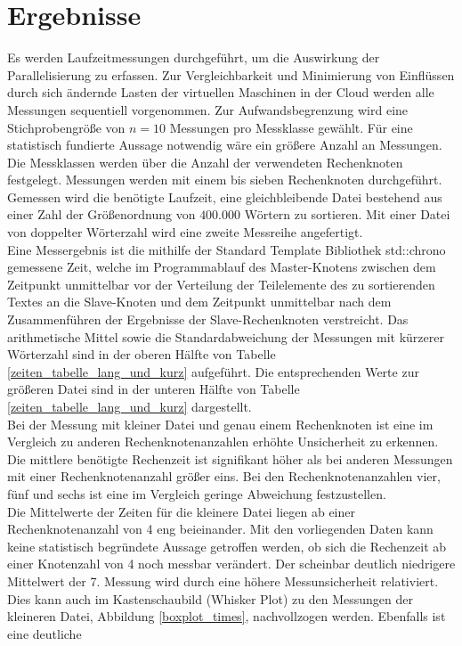 \section{Ergebnisse}
Es werden Laufzeitmessungen durchgeführt, um die Auswirkung der Parallelisierung zu erfassen. Zur Vergleichbarkeit und Minimierung von Einflüssen durch sich ändernde Lasten der virtuellen Maschinen in der Cloud werden alle Messungen sequentiell vorgenommen. Zur Aufwandsbegrenzung wird eine Stichprobengröße von $n = 10$ Messungen pro Messklasse gewählt. Für eine statistisch fundierte Aussage notwendig wäre ein größere Anzahl an Messungen. Die Messklassen werden über die Anzahl der verwendeten Rechenknoten festgelegt. Messungen werden mit einem bis sieben Rechenknoten durchgeführt. Gemessen wird die benötigte Laufzeit, eine gleichbleibende Datei bestehend aus einer Zahl der Größenordnung von $400.000$ Wörtern zu sortieren. Mit einer Datei von doppelter Wörterzahl wird eine zweite Messreihe angefertigt.
\\
Eine Messergebnis ist die mithilfe der Standard Template Bibliothek std::chrono gemessene Zeit, welche im Programmablauf des Master-Knotens zwischen dem Zeitpunkt unmittelbar vor der Verteilung der Teilelemente 
des zu sortierenden Textes an die Slave-Knoten und dem Zeitpunkt unmittelbar nach dem Zusammenführen der Ergebnisse der Slave-Rechenknoten verstreicht.
Das arithmetische Mittel sowie die Standardabweichung der Messungen mit kürzerer Wörterzahl sind in der oberen Hälfte von Tabelle \ref{zeiten_tabelle_lang_und_kurz} aufgeführt. Die entsprechenden Werte zur größeren Datei sind in der unteren Hälfte von Tabelle \ref{zeiten_tabelle_lang_und_kurz} dargestellt.
\\
Bei der Messung mit kleiner Datei und genau einem Rechenknoten ist eine im Vergleich zu anderen Rechenknotenanzahlen erhöhte Unsicherheit zu erkennen. Die mittlere benötigte Rechenzeit ist signifikant höher als bei anderen Messungen mit einer Rechenknotenanzahl größer eins. Bei den Rechenknotenanzahlen vier, fünf und sechs ist eine im Vergleich geringe Abweichung festzustellen.
\\
Die Mittelwerte der Zeiten für die kleinere Datei liegen ab einer Rechenknotenanzahl von 4 eng beieinander. Mit den vorliegenden Daten kann keine statistisch begründete Aussage getroffen werden, ob sich die Rechenzeit ab einer Knotenzahl von 4 noch messbar verändert. Der scheinbar deutlich niedrigere Mittelwert der 7. Messung wird durch eine höhere Messunsicherheit relativiert.
\\
Dies kann auch im Kastenschaubild (Whisker Plot) zu den Messungen der kleineren Datei, Abbildung \ref{boxplot_times}, nachvollzogen werden. Ebenfalls ist eine deutliche 
